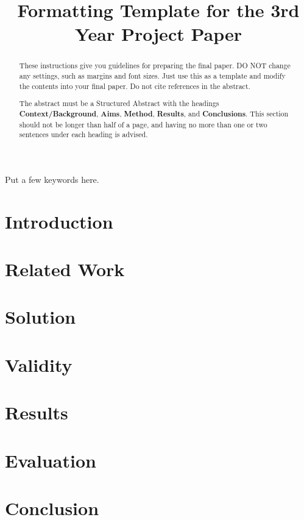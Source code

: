 \documentclass[12pt,a4paper]{article}
\title{Formatting Template for the 3rd Year Project Paper}
\author{}
\date{}
\begin{document}
    \maketitle

    \begin{abstract}
        These instructions give you guidelines for preparing the final paper.  DO NOT change any settings, such as margins and font sizes.  Just use this as a template and modify the contents into your final paper.  Do not cite references in the abstract.

        The abstract must be a Structured Abstract with the headings {\bf Context/Background}, {\bf Aims}, {\bf Method}, {\bf Results}, and {\bf Conclusions}.  This section should not be longer than half of a page, and having no more than one or two sentences under each heading is advised.
    \end{abstract}

    \begin{keywords}
        Put a few keywords here.
    \end{keywords}

    \section{Introduction}\label{sec:introduction}
    

    \section{Related Work}\label{sec:related-work}
    

    \section{Solution}\label{sec:solution}
    

    \section{Validity}\label{sec:validity}
    

    \section{Results}\label{sec:results}
    

    \section{Evaluation}\label{sec:evaluation}
    

    \section{Conclusion}\label{sec:conculsion}
    

    
\end{document}
